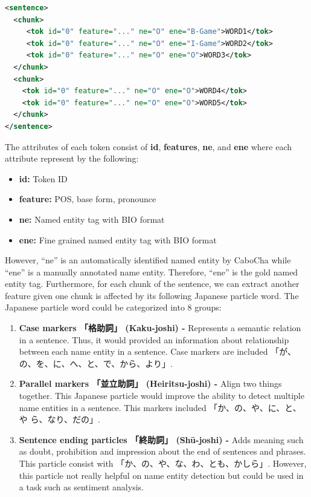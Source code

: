 \begin{CJK*}{UTF8}{min}
\begin{lstlisting}[language={XML}, caption={Corpus XML format}, label={lst:xmlcorpus}]
<sentence>
  <chunk>
     <tok id="0" feature="..." ne="O" ene="B-Game">WORD1</tok>
     <tok id="0" feature="..." ne="O" ene="I-Game">WORD2</tok>
     <tok id="0" feature="..." ne="O" ene="O">WORD3</tok> 
  </chunk>
  <chunk>
    <tok id="0" feature="..." ne="O" ene="O">WORD4</tok>
    <tok id="0" feature="..." ne="O" ene="O">WORD5</tok>
  </chunk> 
</sentence>
\end{lstlisting}
The attributes of each token consist of \textbf{id}, \textbf{features}, \textbf{ne}, and \textbf{ene} where each attribute represent by the following:
\begin{itemize}
    \item \textbf{id:} Token ID 
    \item \textbf{feature:} POS, base form, pronounce
    \item \textbf{ne:} Named entity tag with BIO format
    \item \textbf{ene:} Fine grained named entity tag with BIO format
\end{itemize}
However, ``ne'' is an automatically identified named entity by CaboCha while ``ene'' is a manually annotated name entity.
Therefore, ``ene'' is the gold named entity tag.
Furthermore, for each chunk of the sentence, we can extract another feature given one chunk is affected by its following Japanese particle word.
The Japanese particle word could be categorized into 8 groups:


\begin{enumerate}
    \item \textbf{Case markers 「格助詞」 (Kaku-joshi) -}
    Represents a semantic relation in a sentence.
    Thus, it would provided an information about relationship between each name entity in a sentence.
    Case markers are included 「が、の、を、に、へ、と、で、から、より」.
    \item \textbf{Parallel markers 「並立助詞」 (Heiritsu-joshi) -}
    Align two things together.
    This Japanese particle would improve the ability to detect multiple name entities in a sentence.
    This markers included 「か、の、や、に、と、や ら、なり、だの」.

    \item \textbf{Sentence ending particles 「終助詞」 (Shū-joshi) -}
     Adds meaning such as doubt, prohibition and impression about the end of sentences and phrases.
     This particle consist with 「か、の、や、な、わ、とも、かしら」.
     However, this particle not really helpful on name entity detection but could be used in a task such as sentiment analysis.


\end{enumerate}
\end{CJK*}
